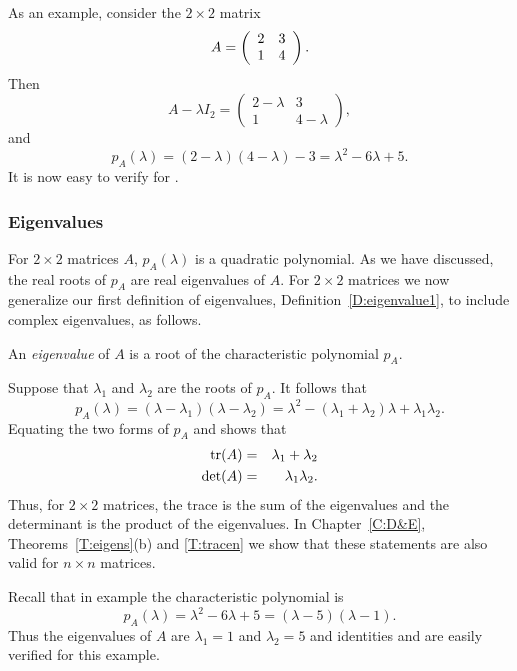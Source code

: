 As an example, consider the $2\times 2$ matrix
\begin{equation} \label{e:2x2ex}
A=\left(\begin{array}{rr} 2 & 3\\ 1 &4\end{array}\right).
\end{equation}
Then
\[
A-\lambda I_2 = \left(\begin{array}{cc} 2-\lambda & 3 \\
1 & 4-\lambda \end{array}\right),
\]
and
\[
p_A(\lambda) = (2-\lambda)(4-\lambda)-3 = \lambda^2-6\lambda+5.
\]
It is now easy to verify  for .

\subsubsection*{Eigenvalues}

For $2\times 2$ matrices $A$, $p_A(\lambda)$ is a quadratic
polynomial.  As we have discussed, the real roots of $p_A$ are
real eigenvalues of $A$.  For $2\times 2$ matrices we now 
generalize our first definition of eigenvalues, 
Definition~\ref{D:eigenvalue1}, to include complex eigenvalues, as follows.

\begin{Def}
An {\em eigenvalue\/} of $A$ is a root of the characteristic polynomial $p_A$.
\end{Def}  
Suppose that $\lambda_1$ and $\lambda_2$ are the roots of $p_A$.
It follows that
\begin{equation}  \label{e:charpolyprod}
p_A(\lambda) = (\lambda-\lambda_1)(\lambda-\lambda_2) =
\lambda^2 - (\lambda_1+\lambda_2)\lambda + \lambda_1\lambda_2.
\end{equation}
Equating the two forms of $p_A$  and
 shows that
\begin{eqnarray}
{\rm tr}(A) & = & \lambda_1 + \lambda_2 \label{e:treigen}\\
\det(A) & = & \lambda_1\lambda_2. \label{e:deteigen}
\end{eqnarray}
Thus, for $2\times 2$ matrices, the trace is the sum of the
eigenvalues and the determinant is the product of the eigenvalues.
In Chapter~\ref{C:D&E}, Theorems~\ref{T:eigens}(b) and
\ref{T:tracen} we show that these statements are also valid for
$n\times n$ matrices.

Recall that in example  the characteristic polynomial
is
\[
p_A(\lambda) = \lambda^2-6\lambda+5=(\lambda-5)(\lambda-1).
\]
Thus the eigenvalues of $A$ are $\lambda_1=1$ and $\lambda_2=5$
and identities  and  are easily
verified for this example.  

